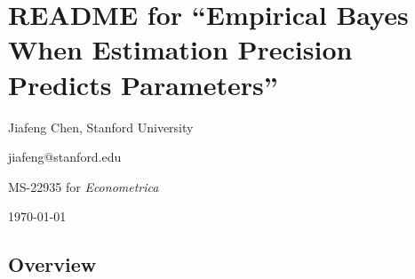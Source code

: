 \documentclass[10pt]{article}
\author{Jiafeng Chen, Stanford University}
\date{\today}
\begin{document}
\hypertarget{template-readme-and-guidance}{%
\section{README for ``Empirical Bayes When Estimation Precision Predicts Parameters''}
\label{template-readme-and-guidance}}

\noindent Jiafeng Chen, Stanford University

\noindent jiafeng@stanford.edu

\noindent MS-22935 for \emph{Econometrica}

\noindent \today


\hypertarget{overview}{%
\subsection{Overview}\label{overview}}

\end{document}
